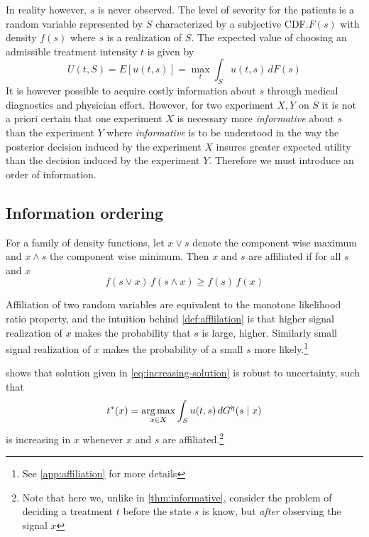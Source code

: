 \documentclass[10pt,a4paper]{article} 					%
\begin{document}
In reality however, \(s\) is never observed. The level of severity for the patients is a random variable represented by \(S\)  characterized by a subjective CDF.\@ \(F(s)\)  with density \(f(s)\)  where \(s\) is a realization of \(S\). The expected value of choosing an admissible treatment intensity \(t\) is given by
\[
	U(t,S)=E[u(t,s)]=\max_{t}\int_{S}u(t,s)\, dF(s)\label{eq:expected-utility-prior}
\]
It is however possible to acquire costly information about \(s\) through medical diagnostics and physician effort. However, for two experiment \(X,Y\) on \(S\)  it is not a priori certain that one experiment \(X\) is necessary more \emph{informative} about \(s\) than the experiment \(Y\)  where \emph{informative} is to be understood in the way the posterior decision induced by the experiment \(X\) insures greater expected utility than the decision induced by the experiment \(Y\). Therefore we must introduce an order of information.


\subsection{Information ordering}

\begin{defn}\label{def:afflilation} \parencite{Milgrom1982}
For a family of density functions, let \(x\lor s\) denote the component wise maximum and \(x\land s\) the component wise minimum. Then \(x\) and \(s\) are affiliated if for all \(s\) and \(x\)
\[
	f(s\lor x)\, f(s\land x)\ge f(s)\, f(x)
\]
\end{defn}

Affiliation of two random variables are equivalent to the monotone likelihood ratio property, and the intuition behind \cref{def:afflilation} is that higher signal realization of \(x\) makes the probability that \(s\) is large, higher. Similarly small signal realization of \(x\) makes the probability of a small \(s\) more likely.\footnote{See \cref{app:affiliation} for more details}

\textcite{Athey2002}  shows that solution given in \cref{eq:increasing-solution} is robust to uncertainty, such that
\[
	t^*(x)=\argmax_{x\in X}\int_Su(t,s)\, dG^\eta(s\mid x)
\]
is increasing in \(x\)  whenever \(x\) and \(s\) are affiliated.\footnote{Note that here we, unlike in \cref{thm:informative}, consider the problem of deciding a treatment \(t\) before the state \(s\) is know, but \emph{after} observing the signal \(x\) }
\end{document}
